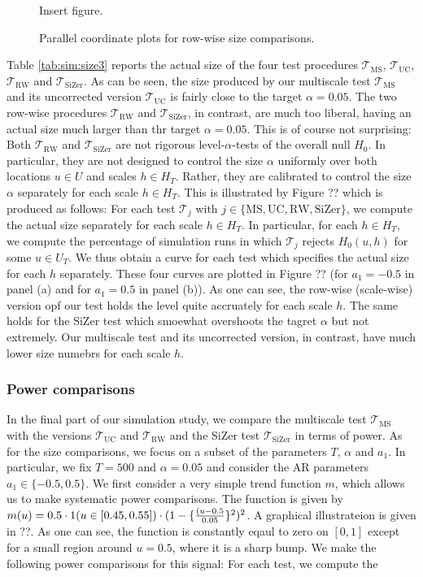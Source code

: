 \begin{figure}[t!]
\centering
Insert figure. 
\caption{Parallel coordinate plots for row-wise size comparisons.}
\end{figure}


Table \ref{tab:sim:size3} reports the actual size of the four test procedures $\mathcal{T}_{\text{MS}}$, $\mathcal{T}_{\text{UC}}$, $\mathcal{T}_{\text{RW}}$ and $\mathcal{T}_{\text{SiZer}}$. As can be seen, the size produced by our multiscale test $\mathcal{T}_{\text{MS}}$ and its uncorrected version $\mathcal{T}_{\text{UC}}$ is fairly close to the target $\alpha=0.05$. The two row-wise procedures $\mathcal{T}_{\text{RW}}$ and $\mathcal{T}_{\text{SiZer}}$, in contrast, are much too liberal, having an actual size much larger than thr target $\alpha=0.05$. This is of course not surprising: Both $\mathcal{T}_{\text{RW}}$ and $\mathcal{T}_{\text{SiZer}}$ are not rigorous level-$\alpha$-tests of the overall null $H_0$. In particular, they are not designed to control the size $\alpha$ uniformly over both locations $u \in U$ and scales $h \in H_T$. Rather, they are calibrated to control the size $\alpha$ separately for each scale $h \in H_T$. This is illustrated by Figure ?? which is produced as follows: For each test $\mathcal{T}_j$ with $j \in \{ \text{MS}, \text{UC}, \text{RW}, \text{SiZer} \}$, we compute the actual size separately for each scale $h \in H_T$. In particular, for each $h \in H_T$, we compute the percentage of simulation runs in which $\mathcal{T}_j$ rejects $H_0(u,h)$ for some $u \in U_T$. We thus obtain a curve for each test which specifies the actual size for each $h$ separately. These four curves are plotted in Figure ?? (for $a_1=-0.5$ in panel (a) and for $a_1=0.5$ in panel (b)). As one can see, the row-wise (scale-wise) version opf  our test holds the level quite accruately for each scale $h$. The same holds for the SiZer test which smoewhat overshoots the tagret $\alpha$ but not extremely. Our multiscale test and its uncorrected version, in contrast, have much lower size numebrs for each scale $h$. 


\subsubsection{Power comparisons}


In the final part of our simulation study, we compare the multiscale test $\mathcal{T}_{\text{MS}}$ with the versions $\mathcal{T}_{\text{UC}}$ and $\mathcal{T}_{\text{RW}}$ and the SiZer test $\mathcal{T}_{\text{SiZer}}$ in terms of power. As for the size comparisons, we focus on a subset of the parameters $T$, $\alpha$ and $a_1$. In particular, we fix $T=500$ and $\alpha=0.05$ and consider the AR parameters $a_1 \in \{-0.5,0.5\}$. We first consider a very simple trend function $m$, which allows us to make systematic power comparisons. The function is given by $m(u) = 0.5 \cdot 1(u \in [0.45,0.55]) \cdot (1 - \{\frac{(u-0.5}{0.05}\}^2)^2$. A graphical illustrateion is given in ??. As one can see, the function is constantly eqaul to zero on $[0,1]$ except for a small region around $u=0.5$, where it is a sharp bump. We make the following power comparisons for this signal: For each test, we compute the 



